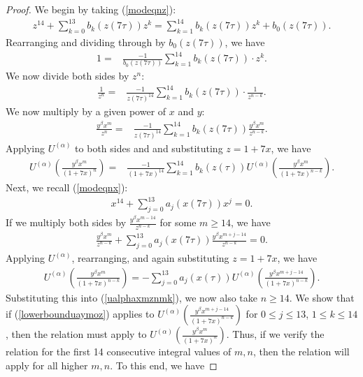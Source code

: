 \documentclass[reqno]{amsart}
\theoremstyle{definition}
\theoremstyle{remark}
\numberwithin{equation}{section}
\begin{document}
\begin{proof}

We begin by taking (\ref{modeqnz}):
\begin{align*}
z^{14}+\sum_{k=0}^{13}b_k(z(7\tau))z^k= \sum_{k=1}^{14}b_k(z(7\tau))z^k + b_0(z(7\tau)).
\end{align*}  Rearranging and dividing through by $b_0(z(7\tau))$, we have
\begin{align*}
1 =& \frac{-1}{b_0(z(7\tau))}\sum_{k=1}^{14}b_k(z(7\tau))\cdot z^{k}.
\end{align*}  We now divide both sides by $z^n$:
\begin{align*}
\frac{1}{z^{n}} =& \frac{-1}{z(7\tau)^{14}}\sum_{k=1}^{14}b_k(z(7\tau))\cdot \frac{1}{z^{n-k}}.
\end{align*}  We now multiply by a given power of $x$ and $y$:
\begin{align*}
\frac{y^{\beta}x^m}{z^{n}} =& \frac{-1}{z(7\tau)^{14}}\sum_{k=1}^{14}b_k(z(7\tau))\frac{y^{\beta}x^m}{z^{n-k}}.
\end{align*}  Applying $U^{(\alpha)}$ to both sides and and substituting $z=1+7x$, we have
\begin{align}
U^{(\alpha)}\left(\frac{y^{\beta}x^m}{(1+7x)^{n}}\right) =& \frac{-1}{(1+7x)^{14}}\sum_{k=1}^{14}b_k(z(\tau)) U^{(\alpha)}\left(\frac{y^{\beta}x^m}{(1+7x)^{n-k}}\right).\label{ualphaxmznmk}
\end{align}  Next, we recall (\ref{modeqnx}):
\begin{align*}
x^{14}+\sum_{j=0}^{13}a_j(x(7\tau))x^j=0.
\end{align*} 
If we multiply both sides by $\frac{y^{\beta}x^{m-14}}{z^{n-k}}$ for some $m\ge 14$, we have
\begin{align*}
\frac{y^{\beta}x^{m}}{z^{n-k}}+\sum_{j=0}^{13}a_j(x(7\tau))\frac{y^{\beta}x^{m+j-14}}{z^{n-k}}=0.
\end{align*}  Applying $U^{(\alpha)}$, rearranging, and again substituting $z=1+7x$, we have
\begin{align*}
U^{(\alpha)}\left(\frac{y^{\beta}x^{m}}{(1+7x)^{n-k}}\right) = -\sum_{j=0}^{13}a_j(x(\tau)) U^{(\alpha)}\left(\frac{y^{\beta}x^{m+j-14}}{(1+7x)^{n-k}}\right).
\end{align*}  Substituting this into (\ref{ualphaxmznmk}), we now also take $n\ge 14$.  We show that if (\ref{lowerbounduaymoz}) applies to $U^{(\alpha)}\left( \frac{y^{\beta}x^{m+j-14}}{(1+7x)^{n-k}} \right)$ for $0\le j\le 13$, $1\le k\le 14$, then the relation must apply to $U^{(\alpha)}\left( \frac{y^{\beta}x^{m}}{(1+7x)^{n}} \right)$.  Thus, if we verify the relation for the first 14 consecutive integral values of $m,n$, then the relation will apply for all higher $m,n$.  To this end, we have

\end{proof}
\end{document}
